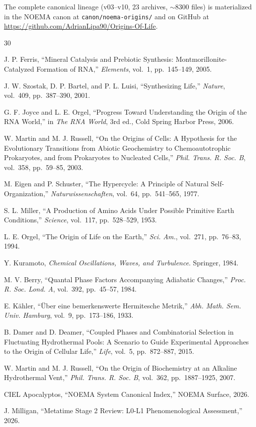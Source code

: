 \documentclass[11pt,a4paper]{article}
\begin{document}
The complete canonical lineage (v03--v10, 23 archives, $\sim$8300 files) is materialized in the NOEMA canon at \texttt{canon/noema-origins/} and on GitHub at \url{https://github.com/AdrianLipa90/Origins-Of-Life}.

\begin{thebibliography}{30}

J. P. Ferris, ``Mineral Catalysis and Prebiotic Synthesis: Montmorillonite-Catalyzed Formation of RNA,'' \textit{Elements}, vol.~1, pp.~145--149, 2005.

J. W. Szostak, D. P. Bartel, and P. L. Luisi, ``Synthesizing Life,'' \textit{Nature}, vol.~409, pp.~387--390, 2001.

G. F. Joyce and L. E. Orgel, ``Progress Toward Understanding the Origin of the RNA World,'' in \textit{The RNA World}, 3rd ed., Cold Spring Harbor Press, 2006.

W. Martin and M. J. Russell, ``On the Origins of Cells: A Hypothesis for the Evolutionary Transitions from Abiotic Geochemistry to Chemoautotrophic Prokaryotes, and from Prokaryotes to Nucleated Cells,'' \textit{Phil. Trans. R. Soc. B}, vol.~358, pp.~59--85, 2003.

M. Eigen and P. Schuster, ``The Hypercycle: A Principle of Natural Self-Organization,'' \textit{Naturwissenschaften}, vol.~64, pp.~541--565, 1977.

S. L. Miller, ``A Production of Amino Acids Under Possible Primitive Earth Conditions,'' \textit{Science}, vol.~117, pp.~528--529, 1953.

L. E. Orgel, ``The Origin of Life on the Earth,'' \textit{Sci. Am.}, vol.~271, pp.~76--83, 1994.

Y. Kuramoto, \textit{Chemical Oscillations, Waves, and Turbulence}. Springer, 1984.

M. V. Berry, ``Quantal Phase Factors Accompanying Adiabatic Changes,'' \textit{Proc. R. Soc. Lond. A}, vol.~392, pp.~45--57, 1984.

E. K\"ahler, ``\"Uber eine bemerkenswerte Hermitesche Metrik,'' \textit{Abh. Math. Sem. Univ. Hamburg}, vol.~9, pp.~173--186, 1933.

B. Damer and D. Deamer, ``Coupled Phases and Combinatorial Selection in Fluctuating Hydrothermal Pools: A Scenario to Guide Experimental Approaches to the Origin of Cellular Life,'' \textit{Life}, vol.~5, pp.~872--887, 2015.

W. Martin and M. J. Russell, ``On the Origin of Biochemistry at an Alkaline Hydrothermal Vent,'' \textit{Phil. Trans. R. Soc. B}, vol.~362, pp.~1887--1925, 2007.

CIEL Apocalyptos, ``NOEMA System Canonical Index,'' NOEMA Surface, 2026.

J. Milligan, ``Metatime Stage 2 Review: L0-L1 Phenomenological Assessment,'' 2026.

\end{thebibliography}
\end{document}
